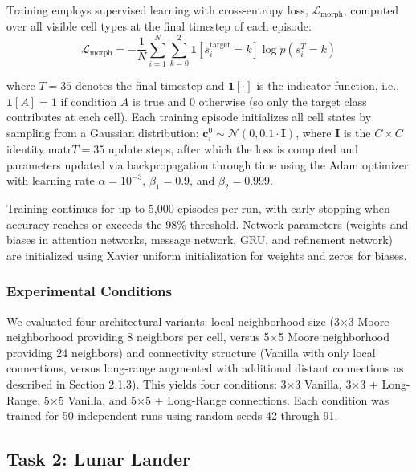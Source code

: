 \documentclass[letterpaper]{article}
\newcommand{\bh}[1]{{\color{black}#1}}  %
\begin{document}
Training employs supervised learning with cross-entropy loss\bh{, $\mathcal{L}_{\text{morph}}$,} computed over all visible cell types at the final timestep of each episode:
\begin{equation}
\mathcal{L}_{\text{morph}} = -\frac{1}{N} \sum_{i=1}^{N} \sum_{k=0}^{2} \mathbf{1}[s_i^{\text{target}} = k] \log p(s_i^T = k)
\end{equation}

where $T = 35$ denotes the final timestep and $\mathbf{1}[\cdot]$ is the indicator function, i.e., $\mathbf{1}[A]=1$ if condition $A$ is true and $0$ otherwise (so only the target class contributes at each cell). Each training episode initializes all cell states by sampling from a Gaussian distribution: 
$\mathbf{c}_i^0 \sim \mathcal{N}(0, 0.1 \cdot \mathbf{I})$, 
where $\mathbf{I}$ is the $C \times C$ identity matr$T=35$ update steps, after which the loss is computed and parameters updated via backpropagation through time using the Adam optimizer with learning rate $\alpha = 10^{-3}$, $\beta_1 = 0.9$, and $\beta_2 = 0.999$.



Training continues for up to 5,000 episodes per run, with early stopping when accuracy reaches or exceeds the 98\% threshold. Network parameters (weights and biases in attention networks, message network, GRU, and refinement network) are initialized using Xavier uniform initialization for weights and zeros for biases.

\subsubsection{Experimental Conditions}

We evaluated four architectural variants: local neighborhood size (3×3 Moore neighborhood providing 8 neighbors per cell, versus 5×5 Moore neighborhood providing 24 neighbors) and connectivity structure (Vanilla with only local connections, versus long-range augmented with additional distant connections as described in Section 2.1.3). This yields four conditions: 3×3 Vanilla, 3×3 + Long-Range, 5×5 Vanilla, and 5×5 + Long-Range connections. Each condition was trained for 50 independent runs using random seeds 42 through 91.

\subsection{Task 2: Lunar Lander}
\end{document}
